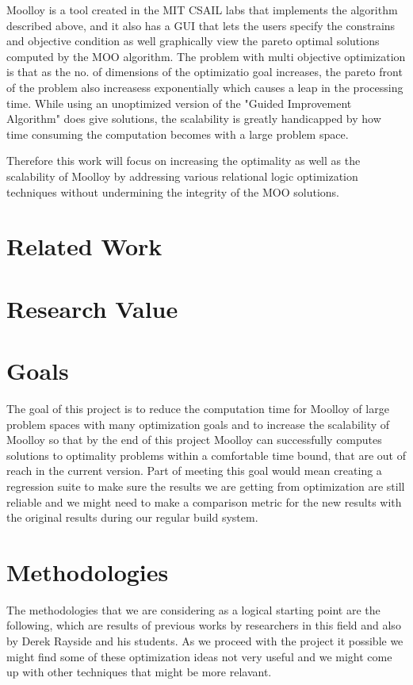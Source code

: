 \documentclass[11pt]{article}
\begin{document}
Moolloy \cite{} is a tool created in the MIT CSAIL labs that implements the algorithm described above, and it also has a GUI that lets the users specify the constrains and objective condition as well graphically view the pareto optimal solutions computed by the MOO algorithm. The problem with multi objective optimization is that as the no. of dimensions of the optimizatio goal increases, the pareto front of the problem also increasess  exponentially which causes a leap in the processing time. While using an unoptimized version of the "Guided Improvement Algorithm" does give solutions, the scalability is greatly handicapped by how time consuming the computation becomes with a large problem space.

Therefore this work will focus on increasing the optimality as well as the scalability of Moolloy by addressing various relational logic optimization techniques without undermining the integrity of the MOO solutions.

\section{Related Work}

\section{Research Value} 

\section{Goals}
The goal of this project is to reduce the computation time for Moolloy of large problem spaces with many optimization goals and to increase the scalability of Moolloy so that by the end of this project Moolloy can successfully computes solutions to optimality problems within a comfortable time bound, that are out of reach in the current version. Part of meeting this  goal would mean creating a regression suite to make sure the results we are getting from optimization are still reliable and we might need to make a comparison metric for the new results with the original results during our regular build system.

\section{Methodologies}
The methodologies that we are considering as a logical starting point are the following, which are results of previous works by researchers in this field and also by Derek Rayside and his students. As we proceed with the project it possible we might find some of these optimization ideas not very useful and we might come up with other techniques that might be more relavant.
\end{document}
